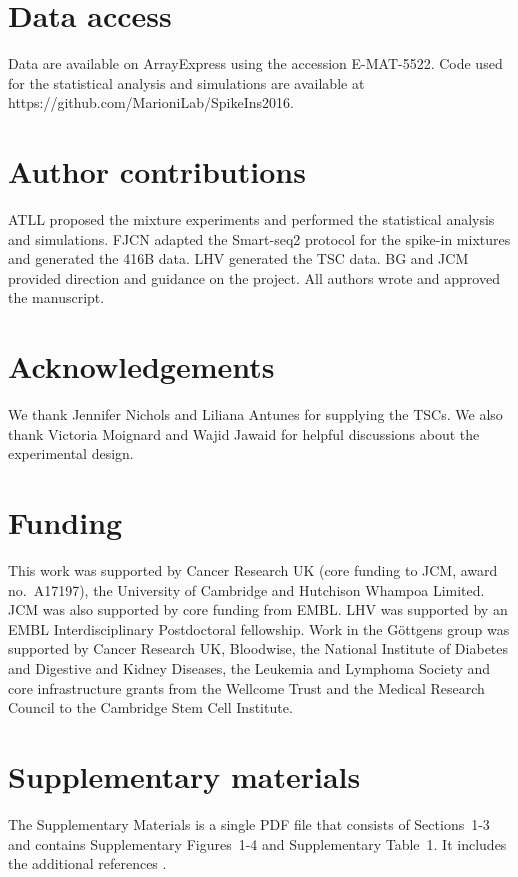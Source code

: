 \documentclass{article}
\newcommand{\suppfigbiophys}{4}
\newcommand{\suppsecsim}{3}
\begin{document}
\section{Data access}
Data are available on ArrayExpress using the accession E-MAT-5522.
Code used for the statistical analysis and simulations are available at https://github.com/MarioniLab/SpikeIns2016.

\section{Author contributions}
ATLL proposed the mixture experiments and performed the statistical analysis and simulations.
FJCN adapted the Smart-seq2 protocol for the spike-in mixtures and generated the 416B data.
LHV generated the TSC data.
BG and JCM provided direction and guidance on the project.
All authors wrote and approved the manuscript.

\section{Acknowledgements}
We thank Jennifer Nichols and Liliana Antunes for supplying the TSCs.
We also thank Victoria Moignard and Wajid Jawaid for helpful discussions about the experimental design.

\section{Funding}
This work was supported by Cancer Research UK (core funding to JCM, award no.\ A17197), the University of Cambridge and Hutchison Whampoa Limited.
JCM was also supported by core funding from EMBL.
LHV was supported by an EMBL Interdisciplinary Postdoctoral fellowship.
Work in the G\"ottgens group was supported by Cancer Research UK, Bloodwise, the National Institute of Diabetes and Digestive and Kidney Diseases, the Leukemia and Lymphoma Society and core infrastructure grants from the Wellcome Trust and the Medical Research Council to the Cambridge Stem Cell Institute.

\section{Supplementary materials}
The Supplementary Materials is a single PDF file that consists of Sections~1-\suppsecsim{} and contains Supplementary Figures~1-\suppfigbiophys{} and Supplementary Table~1.
It includes the additional references \cite{law2014voom,ritchie2015limma}.

{\small


}
\end{document}
